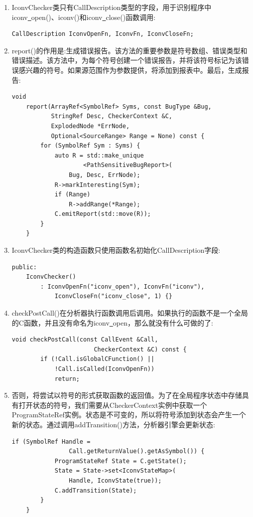 \begin{enumerate}
\item IconvChecker类只有CallDescription类型的字段，用于识别程序中iconv\underline{~}open()、iconv()和iconv\underline{~}close()函数调用:
\begin{lstlisting}[caption={}]
	CallDescription IconvOpenFn, IconvFn, IconvCloseFn;
\end{lstlisting}

\item report()的作用是:生成错误报告。该方法的重要参数是符号数组、错误类型和错误描述。该方法中，为每个符号创建一个错误报告，并将该符号标记为该错误感兴趣的符号。如果源范围作为参数提供，将添加到报表中。最后，生成报告:
\begin{lstlisting}[caption={}]
	void
	report(ArrayRef<SymbolRef> Syms, const BugType &Bug,
		   StringRef Desc, CheckerContext &C,
		   ExplodedNode *ErrNode,
		   Optional<SourceRange> Range = None) const {
		for (SymbolRef Sym : Syms) {
			auto R = std::make_unique
					<PathSensitiveBugReport>(
				Bug, Desc, ErrNode);
			R->markInteresting(Sym);
			if (Range)
				R->addRange(*Range);
			C.emitReport(std::move(R));
		}
	}
\end{lstlisting}

\item IconvChecker类的构造函数只使用函数名初始化CallDescription字段:
\begin{lstlisting}[caption={}]
public:
	IconvChecker()
		: IconvOpenFn("iconv_open"), IconvFn("iconv"),
			IconvCloseFn("iconv_close", 1) {}
\end{lstlisting}

\item checkPostCall()在分析器执行函数调用后调用。如果执行的函数不是一个全局的C函数，并且没有命名为iconv\underline{~}open，那么就没有什么可做的了:
\begin{lstlisting}[caption={}]
	void checkPostCall(const CallEvent &Call,
					   CheckerContext &C) const {
		if (!Call.isGlobalCFunction() ||
			!Call.isCalled(IconvOpenFn))
			return;
\end{lstlisting}

\item 否则，将尝试以符号的形式获取函数的返回值。为了在全局程序状态中存储具有打开状态的符号，我们需要从CheckerContext实例中获取一个ProgramStateRef实例。状态是不可变的，所以将符号添加到状态会产生一个新的状态。通过调用addTransition()方法，分析器引擎会更新状态:
\begin{lstlisting}[caption={}]
	if (SymbolRef Handle =
				Call.getReturnValue().getAsSymbol()) {
			ProgramStateRef State = C.getState();
			State = State->set<IconvStateMap>(
				Handle, IconvState(true));
			C.addTransition(State);
		}
	}
\end{lstlisting}


\end{enumerate}

